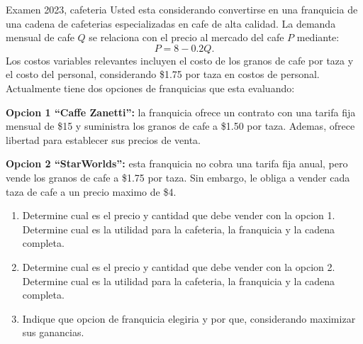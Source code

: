 \begin{enunciado}{Examen 2023, cafeteria}
Usted esta considerando convertirse en una franquicia de una cadena de cafeterias especializadas en cafe de alta calidad. La demanda mensual de cafe $Q$ se relaciona con el precio al mercado del cafe $P$ mediante:
\[
  P=8-0.2Q.
\]
Los costos variables relevantes incluyen el costo de los granos de cafe por taza y el costo del personal, considerando \$1.75 por taza en costos de personal. Actualmente tiene dos opciones de franquicias que esta evaluando:

\textbf{Opcion 1 ``Caffe Zanetti'':} la franquicia ofrece un contrato con una tarifa fija mensual de \$15 y suministra los granos de cafe a \$1.50 por taza. Ademas, ofrece libertad para establecer sus precios de venta.

\textbf{Opcion 2 ``StarWorlds'':} esta franquicia no cobra una tarifa fija anual, pero vende los granos de cafe a \$1.75 por taza. Sin embargo, le obliga a vender cada taza de cafe a un precio maximo de \$4.

\begin{enumerate}[label=\alph*)]
  \item Determine cual es el precio y cantidad que debe vender con la opcion 1. Determine cual es la utilidad para la cafeteria, la franquicia y la cadena completa.
  \item Determine cual es el precio y cantidad que debe vender con la opcion 2. Determine cual es la utilidad para la cafeteria, la franquicia y la cadena completa.
  \item Indique que opcion de franquicia elegiria y por que, considerando maximizar sus ganancias.
\end{enumerate}
\end{enunciado}


